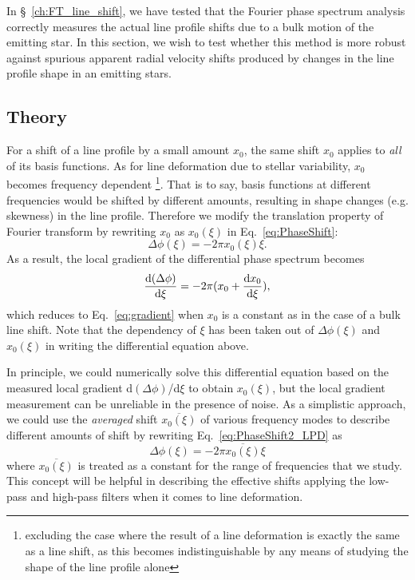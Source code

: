 In \S~\ref{ch:FT_line_shift}, we have tested that the Fourier phase spectrum analysis correctly measures the actual line profile shifts due to a bulk motion of the emitting star. In this section, we wish to test whether this method is more robust against spurious apparent radial velocity shifts produced by changes in the line profile shape in an emitting stars.


\subsection{Theory}
\label{sec:LD_Theory}

For a shift of a line profile by a small amount $x_0$, the same shift $x_0$ applies to \textit{all} of its basis functions. As for line deformation due to stellar variability, $x_0$ becomes frequency dependent \footnote{excluding the case where the result of a line deformation is exactly the same as a line shift, as this becomes indistinguishable by any means of studying the shape of the line profile alone}. That is to say, basis functions at different frequencies would be shifted by different amounts, resulting in shape changes (e.g. skewness) in the line profile. 
Therefore we modify the translation property of Fourier transform by rewriting $x_0$ as $x_0(\xi)$ in Eq.~\ref{eq:PhaseShift}:
\begin{equation}
	\Delta \phi(\xi) = -2 \pi x_0(\xi) \xi.
\label{eq:PhaseShift2_LPD}
\end{equation}
As a result, the local gradient of the differential phase spectrum becomes 
\begin{equation}
	\dv{(\Delta \phi)}{\xi} = -2 \pi (x_0 + \dv{x_0}{\xi}),
\label{eq:PhaseShift3_LPD}
\end{equation}
which reduces to Eq.~\ref{eq:gradient} when $x_0$ is a constant as in the case of a bulk line shift.
Note that the dependency of $\xi$ has been taken out of $\Delta \phi(\xi)$ and 
$x_0(\xi)$ in writing the differential equation above. 

In principle, we could numerically solve this differential equation based on the measured local gradient d$(\Delta \phi)$/d$\xi$ to obtain $x_0(\xi)$, but the local gradient measurement can be unreliable in the presence of noise. As a simplistic approach, we could use the \textit{averaged} shift $\overline{x_0(\xi)}$ of various frequency modes to describe different amounts of shift by rewriting Eq.~\ref{eq:PhaseShift2_LPD} as 
\begin{equation}
	\Delta \phi(\xi) = -2 \pi \overline{x_0(\xi)} \xi
\end{equation}
where $\overline{x_0(\xi)}$ is treated as a constant for the range of frequencies that we study. This concept will be helpful in describing the effective shifts applying the low-pass and high-pass filters when it comes to line deformation.

